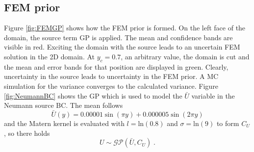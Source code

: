 \documentclass[%
  a4paper,oneside,%
  11pt,%
  smallchapters,
  style=printdev,
  extramargin,
  green,%
  rgb, <cmyk>
  ]{tubsbook}
\begin{document}
\subsection{FEM prior}
Figure \ref{fig:FEMGP} shows how the FEM prior is formed. On the left face of the domain, the source term GP is applied. The mean and confidence bands are visible in red. Exciting the domain with the source leads to an uncertain FEM solution in the 2D domain. At $y_c = 0.7$, an arbitrary value, the domain is cut and the mean and error bands for that position are displayed in green. Clearly, uncertainty in the source leads to uncertainty in the FEM prior. A MC simulation for the variance converges to the calculated variance.
Figure \ref{fig:NeumannBC} shows the GP which is used to model the $\bar{U}$ variable in the Neumann source BC. The mean follows
\begin{equation}
\bar{U}(y) = 0.00001 \sin(\pi y) + 0.000005 \sin(2\pi y)
\end{equation}
and the Matern kernel is evaluated with $l = \mathrm{ln}(0.8)$ and $\sigma = \mathrm{ln}(9)$ to form $C_U$, so there holds
\begin{equation}
U \sim \mathcal{GP}(\bar{U},C_U) \;.
\end{equation}
\end{document}
